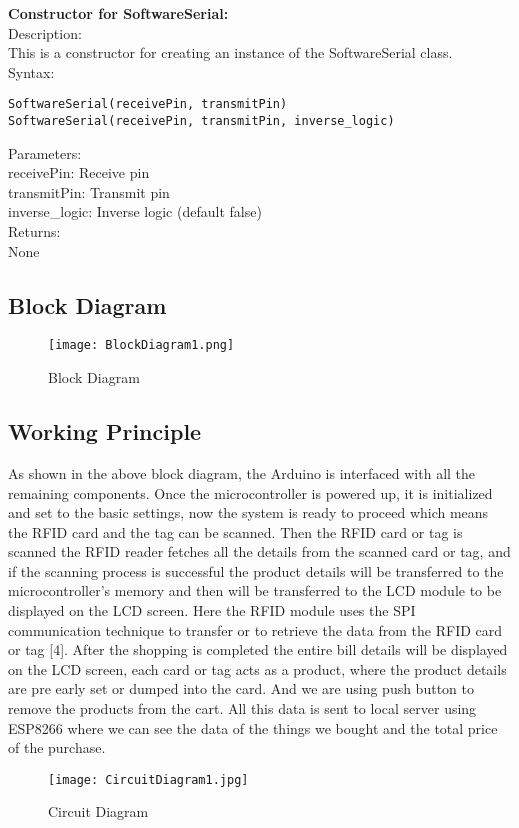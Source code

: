 \documentclass[12pt]{article}
\begin{document}
\textbf{Constructor for SoftwareSerial:}\\
Description:\\
\hspace*{1 cm}This is a constructor for creating an instance of the SoftwareSerial class.\\
Syntax:
\begin{lstlisting}[language=Arduino]  
SoftwareSerial(receivePin, transmitPin)
SoftwareSerial(receivePin, transmitPin, inverse_logic)
\end{lstlisting}
Parameters:\\
\hspace*{1 cm}receivePin: Receive pin\\
\hspace*{1 cm}transmitPin: Transmit pin\\
\hspace*{1 cm}inverse{\_}logic: Inverse logic (default false)\\
Returns:\\
\hspace*{1 cm}None
\subsection{Block Diagram}
\begin{figure}[h]
\texttt{[image: BlockDiagram1.png]}
\centering
\caption{Block Diagram}
\end{figure}

\subsection{Working Principle}
\hspace*{1 cm}As shown in the above block diagram, the Arduino is interfaced with all the remaining components. Once the microcontroller is powered up, it is initialized and set to the basic settings, now the system is ready to proceed which means the RFID card and the tag can be scanned. Then the RFID card or tag is scanned the RFID reader fetches all the details from the scanned card or tag, and if the scanning process is successful the product details will be transferred to the microcontroller’s memory and then will be transferred to the LCD module to be displayed on the LCD screen. Here the RFID module uses the SPI communication technique to transfer or to retrieve the data from the RFID card or tag [4]. After the shopping is completed the entire bill details will be displayed on the LCD screen, each card or tag acts as a product, where the product details are pre early set or dumped into the card. And we are using push button to remove the products from the cart. All this data is sent to local server using ESP8266 where we can see the data of the things we bought and the total price of the purchase.
\begin{figure}[h]
\centering
\texttt{[image: CircuitDiagram1.jpg]}
\caption{Circuit Diagram}
\end{figure}
\end{document}
